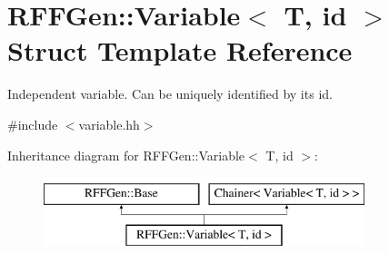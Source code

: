 \hypertarget{structRFFGen_1_1Variable}{\section{R\-F\-F\-Gen\-:\-:Variable$<$ T, id $>$ Struct Template Reference}
\label{structRFFGen_1_1Variable}
}


Independent variable. Can be uniquely identified by its id.  




{\ttfamily \#include $<$variable.\-hh$>$}

Inheritance diagram for R\-F\-F\-Gen\-:\-:Variable$<$ T, id $>$\-:\begin{figure}[H]
\begin{center}
\leavevmode
\includegraphics[height=2.000000cm]{structRFFGen_1_1Variable}
\end{center}
\end{figure}
